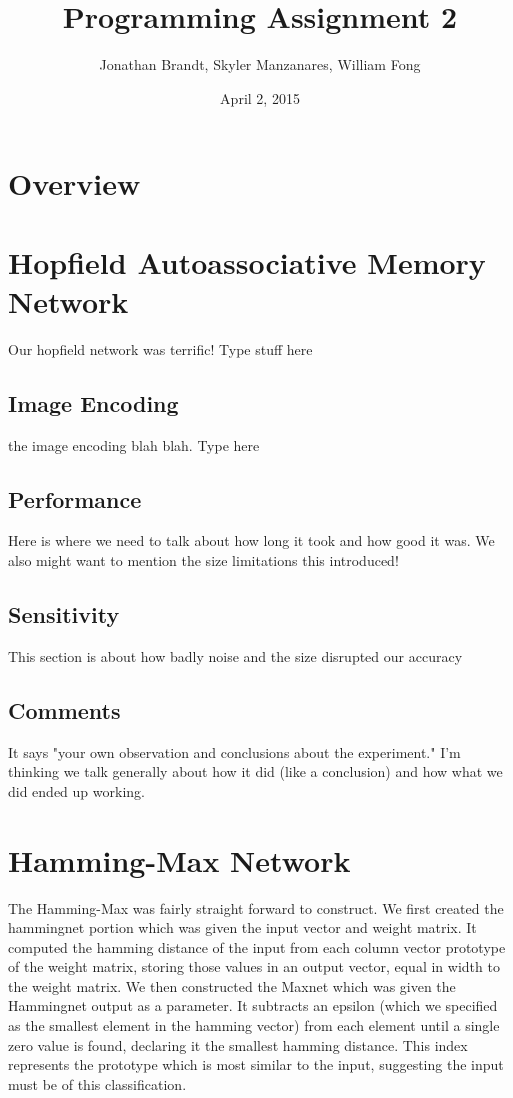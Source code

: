 \documentclass{article}
\begin{document}
\author{Jonathan Brandt, Skyler Manzanares, William Fong}
\date{April 2, 2015}
\title{Programming Assignment 2}

\maketitle

\section{Overview}

\section{Hopfield Autoassociative Memory Network}
Our hopfield network was terrific! Type stuff here

\subsection{Image Encoding}
the image encoding blah blah. Type here

\subsection{Performance}
Here is where we need to talk about how long it took and how good it was. We
also might want to mention the size limitations this introduced!

\subsection{Sensitivity}
This section is about how badly noise and the size disrupted our accuracy

\subsection{Comments}
It says "your own observation and conclusions about the experiment."
I'm thinking we talk generally about how it did (like a conclusion) and how
what we did ended up working.





\section{Hamming-Max Network}
The Hamming-Max was fairly straight forward to construct.  We first created the hammingnet portion which was given the input vector and weight matrix.  It computed the hamming distance of the input from each column vector prototype of the weight matrix, storing those values in an output vector, equal in width to the weight matrix.  We then constructed the Maxnet which was given the Hammingnet output as a parameter.  It subtracts an epsilon (which we specified as the smallest element in the hamming vector) from each element until a single zero value is found, declaring it the smallest hamming distance.  This index represents the prototype which is most similar to the input, suggesting the input must be of this classification.
\end{document}
